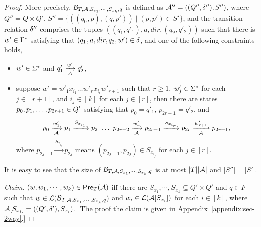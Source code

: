 \begin{proof}
More precisely, $\mathcal{B}_{T, \mathcal{A}, S_{x_1}, \cdots, S_{x_k}, q}$ is defined as
$\mathcal{A}'' = ((Q'', \delta''), S'')$, where $Q'' = Q \times Q'$, $S'' = \{((q_0, p), (q, p')) \mid (p, p') \in S'\}$, and the transition relation $\delta''$ comprises the tuples $((q_1, q'_1), a, dir, (q_2, q'_2))$ such that there is $w' \in \Gamma^*$ satisfying that $(q_1, a, dir, q_2, w') \in \delta$, and one of the following constraints holds, 
\begin{itemize}
\item $w' \in \Sigma^*$  and $q'_1 \xrightarrow[\mathcal{A}]{w'} q'_2$, 
%
\item suppose $w' = w'_1 x_{i_1} \ldots w'_{r} x_{i_{r}} w'_{r+1}$ such that $r \ge 1$, $w'_j \in \Sigma^*$ for each $j \in [r+1]$,  and $i_j \in [k]$ for each $j \in [r]$, then there are states $p_0, p_1, \ldots, p_{2r+1} \in Q'$ satisfying that $p_0 = q'_1$, $p_{2r+1} = q'_2$, and 
$$p_0 \xrightarrow[\mathcal{A}]{w'_1} p_1 \xrightarrow{S_{x_{i_1}}} p_2\ \ldots\ p_{2r-2} \xrightarrow[\mathcal{A}]{w'_r}p_{2r-1} \xrightarrow{S_{x_{i_r}}} p_{2r} \xrightarrow[\mathcal{A}]{w'_{r+1}} p_{2r+1},$$ 
where $p_{2j-1} \xrightarrow{S_{x_{i_j}}} p_{2j}$ means $(p_{2j-1}, p_{2j}) \in S_{x_{i_j}}$ for each $j \in [r]$.
\end{itemize}
%
%
It is easy to see that  the size of $\mathcal{B}_{T, \mathcal{A}, S_{x_1}, \cdots, S_{x_k}, q}$ is at most $|T||\mathcal{A}|$ and $|S''| = |S'|$.   

\smallskip
\noindent
\emph{Claim.} %
$(w, w_1,\cdots, w_k) \in \textsf{Pre}_{T}(\mathcal{A})$ iff there are $S_{x_1}, \cdots, S_{x_k} \subseteq Q' \times Q'$ and $q \in F$ such that $w \in \mathcal{L}(\mathcal{B}_{T, \mathcal{A}, S_{x_1}, \cdots, S_{x_k}, q})$ and $w_i \in \mathcal{L}(\mathcal{A}[S_{x_i}])$ for each $i \in [k]$, where $\mathcal{A}[S_{x_i}]=((Q', \delta'), S_{x_i})$. [The proof the claim is given in Appendix~\ref{appendix:sec-2way}.]
\smallskip


\end{proof}
